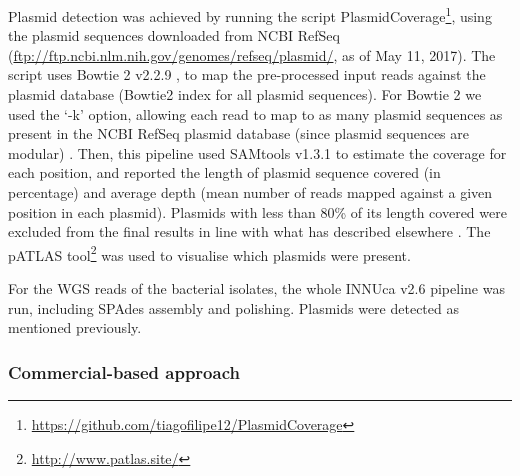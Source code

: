 Plasmid detection was achieved by running the script PlasmidCoverage\footnote{\url{https://github.com/tiagofilipe12/PlasmidCoverage}}, using the plasmid sequences downloaded from NCBI RefSeq (\url{ftp://ftp.ncbi.nlm.nih.gov/genomes/refseq/plasmid/}, as of May 11, 2017). 
The script uses Bowtie 2 v2.2.9 \citep{langmead_fast_2012}, to map the pre-processed input reads against the plasmid database (Bowtie2 index for all plasmid sequences). 
For Bowtie 2 we used the ‘-k’ option, allowing each read to map to as many plasmid sequences as present in the NCBI RefSeq plasmid database (since plasmid sequences are modular) \citep{smillie_mobility_2010, barcia_identification_2011}. 
Then, this pipeline used SAMtools v1.3.1 \citep{li_sequence_2009} to estimate the coverage for each position, and reported the length of plasmid sequence covered (in percentage) and average depth (mean number of reads mapped against a given position in each plasmid). 
Plasmids with less than 80\% of its length covered were excluded from the final results in line with what has described elsewhere \citep{jitwasinkul_plasmid_2016}. The pATLAS tool\footnote{\url{http://www.patlas.site/}} was used to visualise which plasmids were present.

For the WGS reads of the bacterial isolates, the whole INNUca v2.6 pipeline was run, including SPAdes assembly and polishing. 
Plasmids were detected as mentioned previously.

\subsubsection{Commercial-based approach}

